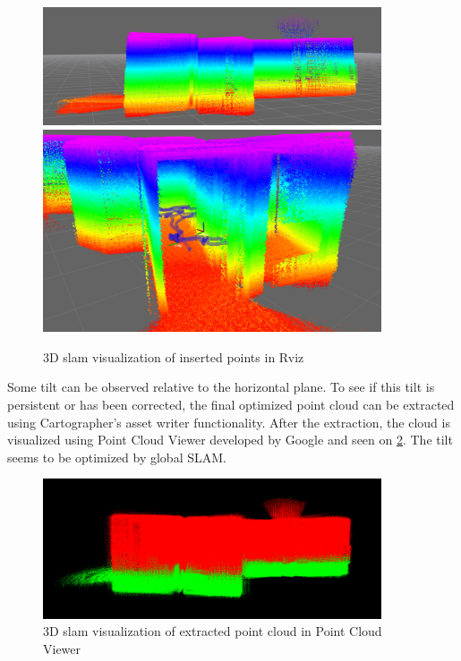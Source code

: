 \begin{figure}[!h]
    \centering
	\includegraphics[width=100mm, keepaspectratio]{figures/09_pointcloud2.png}
    \includegraphics[height=60mm, keepaspectratio]{figures/09_pointcloud3.png}
    \caption{3D slam visualization of inserted points in Rviz}
    \label{fig:09_3d_pointclouds}
\end{figure}

Some tilt can be observed relative to the horizontal plane. To see if this tilt is
persistent or has been corrected, the final optimized point cloud can be extracted using
Cartographer's asset writer functionality. After the extraction, the cloud is visualized using Point Cloud
Viewer developed by Google and seen on \ref{fig:09_3d_pointcloud_pcl}. The tilt seems to be optimized
by global SLAM.

\begin{figure}[!h]
    \centering
	\includegraphics[width=100mm, keepaspectratio]{figures/09_pointcloud4.png}
    \caption{3D slam visualization of extracted point cloud in Point Cloud Viewer}
    \label{fig:09_3d_pointcloud_pcl}
\end{figure}




